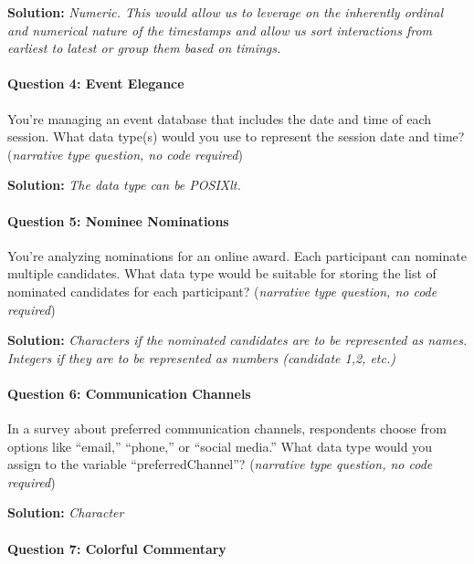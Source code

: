 \documentclass[
]{article}
\begin{document}
\textbf{Solution:} \emph{Numeric. This would allow us to leverage on the
inherently ordinal and numerical nature of the timestamps and allow us
sort interactions from earliest to latest or group them based on
timings.}

\hypertarget{question-4-event-elegance}{%
\paragraph{Question 4: Event Elegance}\label{question-4-event-elegance}}

You're managing an event database that includes the date and time of
each session. What data type(s) would you use to represent the session
date and time? (\emph{narrative type question, no code required})

\textbf{Solution:} \emph{The data type can be POSIXlt.}

\hypertarget{question-5-nominee-nominations}{%
\paragraph{Question 5: Nominee
Nominations}\label{question-5-nominee-nominations}}

You're analyzing nominations for an online award. Each participant can
nominate multiple candidates. What data type would be suitable for
storing the list of nominated candidates for each participant?
(\emph{narrative type question, no code required})

\textbf{Solution:} \emph{Characters if the nominated candidates are to
be represented as names. Integers if they are to be represented as
numbers (candidate 1,2, etc.)}

\hypertarget{question-6-communication-channels}{%
\paragraph{Question 6: Communication
Channels}\label{question-6-communication-channels}}

In a survey about preferred communication channels, respondents choose
from options like ``email,'' ``phone,'' or ``social media.'' What data
type would you assign to the variable ``preferredChannel''?
(\emph{narrative type question, no code required})

\textbf{Solution:} \emph{Character}

\hypertarget{question-7-colorful-commentary}{%
\paragraph{Question 7: Colorful
Commentary}\label{question-7-colorful-commentary}}
\end{document}
